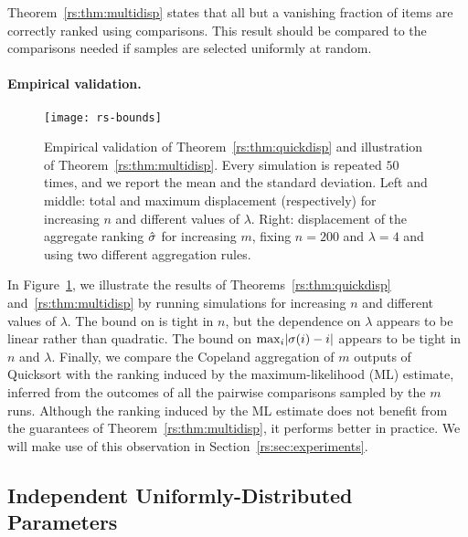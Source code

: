 Theorem~\ref{rs:thm:multidisp} states that all but a vanishing fraction of items are correctly ranked using  comparisons.
This result should be compared to the  comparisons needed if samples are selected uniformly at random.

\paragraph{Empirical validation.}

\begin{figure}[p]
\centering
\texttt{[image: rs-bounds]}
\caption{
Empirical validation of Theorem~\ref{rs:thm:quickdisp} and illustration of Theorem~\ref{rs:thm:multidisp}.
Every simulation is repeated $50$ times, and we report the mean and the standard deviation.
Left and middle: total and maximum displacement (respectively) for increasing $n$ and different values of $\lambda$.
Right: displacement of the aggregate ranking $\hat{\sigma}$ for increasing $m$, fixing $n = \num{200}$ and $\lambda = \num{4}$ and using two different aggregation rules.
}
\label{rs:fig:bounds}
\end{figure}

In Figure~\ref{rs:fig:bounds}, we illustrate the results of Theorems~\ref{rs:thm:quickdisp} and~\ref{rs:thm:multidisp} by running simulations for increasing $n$ and different values of $\lambda$.
The bound on \Disp{\sigma} is tight in $n$, but the dependence on $\lambda$ appears to be linear rather than quadratic.
The bound on $\max_i \lvert \sigma(i) - i \rvert$ appears to be tight in $n$ and $\lambda$.
Finally, we compare the Copeland aggregation of $m$ outputs of Quicksort with the ranking induced by the maximum-likelihood (ML) estimate, inferred from the outcomes of all the pairwise comparisons sampled by the $m$ runs.
Although the ranking induced by the ML estimate does not benefit from the guarantees of Theorem~\ref{rs:thm:multidisp}, it performs better in practice.
We will make use of this observation in Section~\ref{rs:sec:experiments}.


\subsection{Independent Uniformly-Distributed Parameters}
\label{rs:sec:iidunif}

